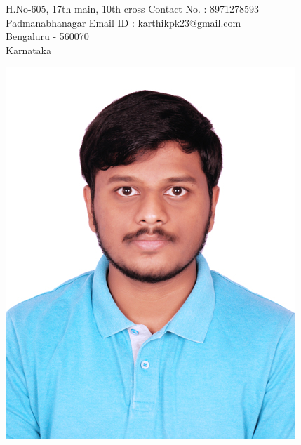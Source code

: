 \documentclass{resume} %
\begin{document}
\begin{rSection}{ }

H.No-605, 17th main, 10th cross \hfill  Contact No. : 8971278593 \\
Padmanabhanagar  \hfill Email ID : karthikpk23@gmail.com \\
Bengaluru - 560070\\
Karnataka\\
\end{rSection}

\begin{center}
\hspace{10 cm}
\includegraphics{karthik}
\end{center}
\end{document}
